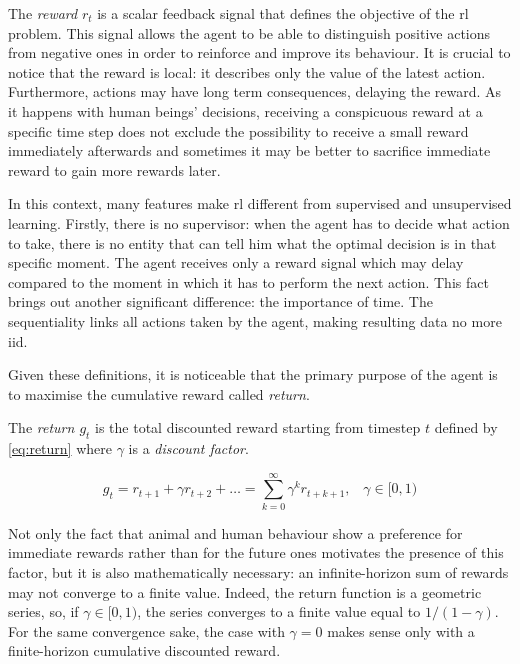The \textit{reward} $r_t$ is a scalar feedback signal that defines the objective of the \acrshort{rl} problem. This signal allows the agent to be able to distinguish positive actions from negative ones in order to reinforce and improve its behaviour. It is crucial to notice that the reward is local: it describes only the value of the latest action. Furthermore, actions may have long term consequences, delaying the reward. As it happens with human beings' decisions, receiving a conspicuous reward at a specific time step does not exclude the possibility to receive a small reward immediately afterwards and sometimes it may be better to sacrifice immediate reward to gain more rewards later.


In this context, many features make \acrshort{rl} different from supervised and unsupervised learning.
Firstly, there is no supervisor: when the agent has to decide what action to take, there is no entity that can tell him what the optimal decision is in that specific moment. The agent receives only a reward signal which may delay compared to the moment in which it has to perform the next action. 
This fact brings out another significant difference: the importance of time. The sequentiality links all actions taken by the agent, making resulting data no more \acrfull{iid}.

Given these definitions, it is noticeable that the primary purpose of the agent is to maximise the cumulative reward called \textit{return}.

The \textit{return $g_t$} is the total discounted reward starting from timestep $t$ defined by \vref{eq:return} where $\gamma$ is a \textit{discount factor}.

\begin{equation} \label{eq:return} 
	g_t = r_{t+1} + \gamma r_{t+2} + \dots = \sum_{k=0}^{\infty} \gamma^k r_{t+k+1}, \;\;\;\gamma \in [0,1)
\end{equation}

 Not only the fact that animal and human behaviour show a preference for immediate rewards rather than for the future ones motivates the presence of this factor, but it is also mathematically necessary: an infinite-horizon sum of rewards may not converge to a finite value. Indeed, the return function is a geometric series, so, if $\gamma \in [0,1)$, the series converges to a finite value equal to $1/(1-\gamma)$. For the same convergence sake, the case with $\gamma = 0$ makes sense only with a finite-horizon cumulative discounted reward.

